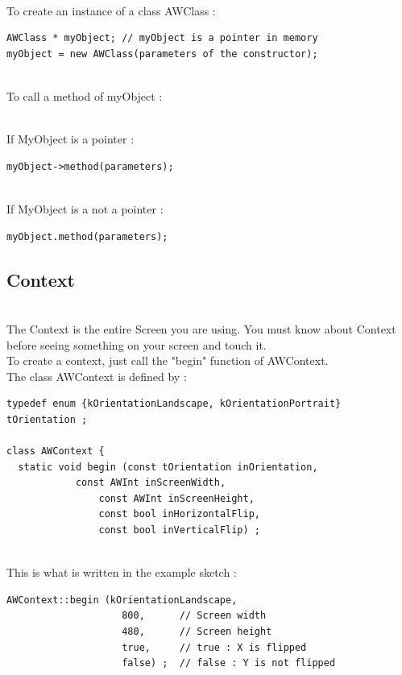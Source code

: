 \documentclass[a4paper,11pt]{extarticle}
\begin{document}
~\\To create an instance of a class AWClass :

\begin{lstlisting}[language=Arduinonl]
AWClass * myObject;	// myObject is a pointer in memory
myObject = new AWClass(parameters of the constructor);
\end{lstlisting}

~\\To call a method of myObject :

~\\ If MyObject is a pointer :

\begin{lstlisting}[language=Arduinonl]
myObject->method(parameters);
\end{lstlisting}

~\\ If MyObject is a not a pointer :

\begin{lstlisting}[language=Arduinonl]
myObject.method(parameters);
\end{lstlisting}


\subsection{Context}

~\\ The Context is the entire Screen you are using. You must know about Context before seeing something on your screen and touch it. 
~\\ To create a context, just call the "begin" function of AWContext.
~\\ The class AWContext is defined by :

\begin{lstlisting}[language=Arduinonl]
typedef enum {kOrientationLandscape, kOrientationPortrait} tOrientation ;

class AWContext {
  static void begin (const tOrientation inOrientation,
  			const AWInt inScreenWidth,
				const AWInt inScreenHeight,
				const bool inHorizontalFlip,
				const bool inVerticalFlip) ;
\end{lstlisting}

~\\ This is what is written in the example sketch :

\begin{lstlisting}[language=Arduinonl]
 AWContext::begin (kOrientationLandscape,
                    800,      // Screen width
                    480,      // Screen height
                    true,     // true : X is flipped
                    false) ;  // false : Y is not flipped
\end{lstlisting}
\end{document}
